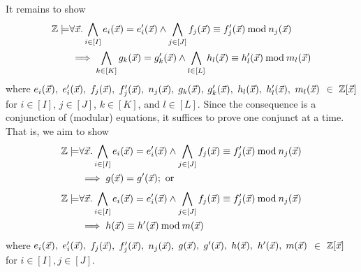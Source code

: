 
It remains to show
\begin{equation*}
\begin{aligned}
  \bbfZ \models & \forall \vx. %
  \bigwedge\limits_{i \in [I]} e_i (\vx) = e'_i (\vx) \wedge
  \bigwedge\limits_{j \in [J]} f_j (\vx) \equiv f'_j (\vx) \mod n_j(\vx) \\
  & \implies
  \bigwedge\limits_{k \in [K]} g_k (\vx) = g'_k (\vx) \wedge
  \bigwedge\limits_{l \in [L]} h_l (\vx) \equiv h'_l (\vx) \mod m_l(\vx)
\end{aligned}
\end{equation*}
where
$e_i (\vec{x}),$ $e'_i (\vec{x}),$ $f_j (\vec{x}),$ $f'_j (\vec{x}),$ $n_j(\vec{x}),$
$g_k (\vec{x}),$ $g'_k (\vec{x}),$ $h_l (\vec{x}),$ $h'_l (\vec{x}),$ $m_l(\vec{x})$ $\in$
 $\mathbb{Z}[\vec{x}]$ for $i \in [I]$, $j \in [J]$, $k
 \in [K]$, and $l \in [L]$. Since the
consequence is a conjunction of (modular) equations, it suffices to
prove one conjunct at a time. That is, we aim to show
\begin{equation*}
\begin{aligned}
  \label{eq:polynomial-equation-implicant}
  \bbfZ \models & \forall \vx. %
  \bigwedge\limits_{i \in [I]} e_i (\vx) = e'_i (\vx) \wedge
  \bigwedge\limits_{j \in [J]} f_j (\vx) \equiv f'_j (\vx) \mod n_j (\vx) \\
  & \implies
  g (\vx) = g' (\vx); \textmd{ or}
\end{aligned}
\end{equation*}
\begin{equation*}
\begin{aligned}
   \label{eq:modular-polynomial-equation-implicant}
   \bbfZ \models & \forall \vx. %
   \bigwedge\limits_{i \in [I]} e_i (\vx) = e'_i (\vx) \wedge
   \bigwedge\limits_{j \in [J]} f_j (\vx) \equiv f'_j (\vx) \mod n_j (\vx) \\
   & \implies
   h (\vx) \equiv h' (\vx) \mod m (\vx)
\end{aligned}
\end{equation*}
where $e_i (\vec{x}),$ $e'_i (\vec{x}),$ $f_j (\vec{x}),$ $f'_j (\vec{x}),$ $n_j (\vec{x}),$ $g (\vec{x}),$ $g' (\vec{x}),$
$h (\vec{x}),$ $h' (\vec{x}),$ $m(\vec{x})$ $\in$ $\mathbb{Z}[\vec{x}]$ for $i \in [I], j \in [J]$.


